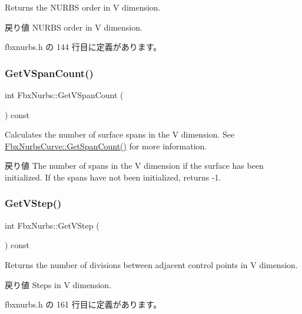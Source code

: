 Returns the N\+U\+R\+BS order in V dimension. \begin{DoxyReturn}{戻り値}
N\+U\+R\+BS order in V dimension. 
\end{DoxyReturn}


 fbxnurbs.\+h の 144 行目に定義があります。

\mbox{\label{class_fbx_nurbs_a7e3517eab37efde3ed70789fdfc62dfe}} 
\subsubsection{\texorpdfstring{Get\+V\+Span\+Count()}{GetVSpanCount()}}
{\footnotesize\ttfamily int Fbx\+Nurbs\+::\+Get\+V\+Span\+Count (\begin{DoxyParamCaption}{ }\end{DoxyParamCaption}) const}

Calculates the number of surface spans in the V dimension. See \hyperlink{class_fbx_nurbs_curve_acb1cf2016f20b2a0c8df382046c7d3ea}{Fbx\+Nurbs\+Curve\+::\+Get\+Span\+Count()} for more information. \begin{DoxyReturn}{戻り値}
The number of spans in the V dimension if the surface has been initialized. If the spans have not been initialized, returns -\/1. 
\end{DoxyReturn}
\mbox{\label{class_fbx_nurbs_abd23a5b818a3227b9de8a4aec12d2e1b}} 
\subsubsection{\texorpdfstring{Get\+V\+Step()}{GetVStep()}}
{\footnotesize\ttfamily int Fbx\+Nurbs\+::\+Get\+V\+Step (\begin{DoxyParamCaption}{ }\end{DoxyParamCaption}) const\hspace{0.3cm}{\ttfamily [inline]}}

Returns the number of divisions between adjacent control points in V dimension. \begin{DoxyReturn}{戻り値}
Steps in V dimension. 
\end{DoxyReturn}


 fbxnurbs.\+h の 161 行目に定義があります。

